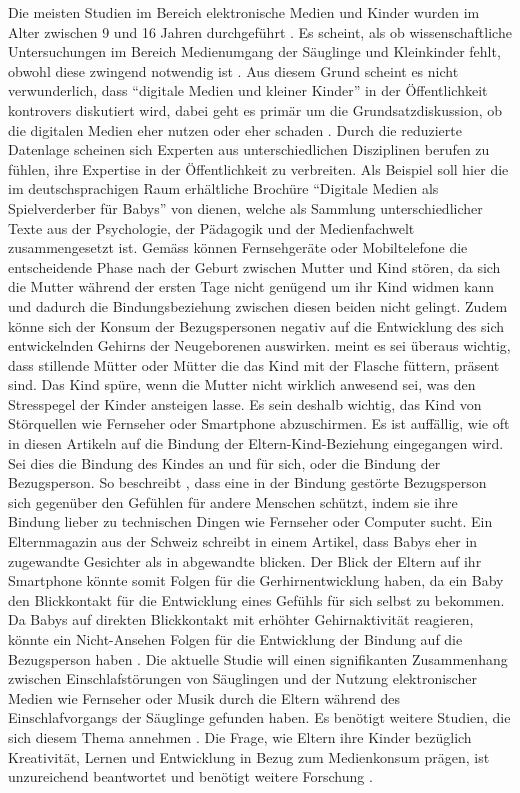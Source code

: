 Die meisten Studien im Bereich elektronische Medien und Kinder wurden im Alter zwischen 9 und 16 Jahren durchgeführt \cite{Chaudron2015}. Es scheint, als ob wissenschaftliche Untersuchungen im Bereich Medienumgang der Säuglinge und Kleinkinder fehlt, obwohl diese zwingend notwendig ist \cite{Olafsson2014, Konitzer2017}. Aus diesem Grund scheint es nicht verwunderlich, dass \enquote{digitale Medien und kleiner Kinder} in der Öffentlichkeit kontrovers diskutiert wird, dabei geht es primär um die Grundsatzdiskussion, ob die digitalen Medien eher nutzen oder eher schaden \cite{Divsi2015}. Durch die reduzierte Datenlage scheinen sich Experten aus unterschiedlichen Disziplinen berufen zu fühlen, ihre Expertise in der Öffentlichkeit zu verbreiten. Als Beispiel soll hier die im deutschsprachigen Raum erhältliche Brochüre \enquote{Digitale Medien als Spielverderber für Babys} von  dienen, welche als Sammlung unterschiedlicher Texte aus der Psychologie, der Pädagogik und der Medienfachwelt zusammengesetzt ist. Gemäss  können Fernsehgeräte oder Mobiltelefone die entscheidende Phase nach der Geburt zwischen Mutter und Kind stören, da sich die Mutter während der ersten Tage nicht genügend um ihr Kind widmen kann und dadurch die Bindungsbeziehung zwischen diesen beiden nicht gelingt. Zudem könne sich der Konsum der Bezugspersonen negativ auf die Entwicklung des sich entwickelnden Gehirns der Neugeborenen auswirken.  meint es sei überaus wichtig, dass stillende Mütter oder Mütter die das Kind mit der Flasche füttern, präsent sind. Das Kind spüre, wenn die Mutter nicht wirklich anwesend sei, was den Stresspegel der Kinder ansteigen lasse. Es sein deshalb wichtig, das Kind von Störquellen wie Fernseher oder Smartphone abzuschirmen. Es ist auffällig, wie oft in diesen Artikeln auf die Bindung der Eltern-Kind-Beziehung eingegangen wird. Sei dies die Bindung des Kindes an und für sich, oder die Bindung der Bezugsperson. So beschreibt , dass eine in der Bindung gestörte Bezugsperson sich gegenüber den Gefühlen für andere Menschen schützt, indem sie ihre Bindung lieber zu technischen Dingen wie Fernseher oder Computer sucht. Ein Elternmagazin aus der Schweiz schreibt in einem Artikel, dass Babys eher in zugewandte Gesichter als in abgewandte blicken. Der Blick der Eltern auf ihr Smartphone könnte somit Folgen für die Gerhirnentwicklung haben, da ein Baby den Blickkontakt für die Entwicklung eines Gefühls für sich selbst zu bekommen. Da Babys auf direkten Blickkontakt mit erhöhter Gehirnaktivität reagieren, könnte ein Nicht-Ansehen Folgen für die Entwicklung der Bindung auf die Bezugsperson haben \cite{Weber2017}. Die aktuelle Studie  will einen signifikanten Zusammenhang zwischen Einschlafstörungen von Säuglingen und der Nutzung elektronischer Medien wie Fernseher oder Musik durch die Eltern während des Einschlafvorgangs der Säuglinge gefunden haben. Es benötigt weitere Studien, die sich diesem Thema annehmen \cite{Wartella2016}. Die Frage, wie Eltern ihre Kinder bezüglich Kreativität, Lernen und Entwicklung in Bezug zum Medienkonsum prägen, ist unzureichend beantwortet und benötigt weitere Forschung \cite{AmericanAcademyofPediatrics2011,Troseth2016}. 

